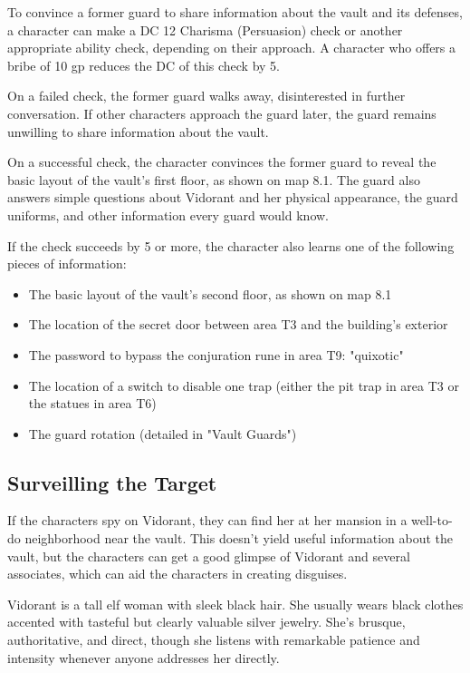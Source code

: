 \documentclass[10pt,a4paper,twoside,bg=print,twocolumn,openany,nodeprecatedcode]{dndbook}
\begin{document}
To convince a former guard to share information about the vault and its defenses, a character can make a DC 12 Charisma (Persuasion) check or another appropriate ability check, depending on their approach. A character who offers a bribe of 10 gp reduces the DC of this check by 5.

On a failed check, the former guard walks away, disinterested in further conversation. If other characters approach the guard later, the guard remains unwilling to share information about the vault.

On a successful check, the character convinces the former guard to reveal the basic layout of the vault's first floor, as shown on map 8.1. The guard also answers simple questions about Vidorant and her physical appearance, the guard uniforms, and other information every guard would know.

If the check succeeds by 5 or more, the character also learns one of the following pieces of information:


\begin{itemize}
\item The basic layout of the vault's second floor, as shown on map 8.1
\item The location of the secret door between area T3 and the building's exterior
\item The password to bypass the conjuration rune in area T9: "quixotic"
\item The location of a switch to disable one trap (either the pit trap in area T3 or the statues in area T6)
\item The guard rotation (detailed in "Vault Guards")
\end{itemize}

\subsection{Surveilling the Target}
If the characters spy on Vidorant, they can find her at her mansion in a well-to-do neighborhood near the vault. This doesn't yield useful information about the vault, but the characters can get a good glimpse of Vidorant and several associates, which can aid the characters in creating disguises.

Vidorant is a tall elf woman with sleek black hair. She usually wears black clothes accented with tasteful but clearly valuable silver jewelry. She's brusque, authoritative, and direct, though she listens with remarkable patience and intensity whenever anyone addresses her directly.
\end{document}
